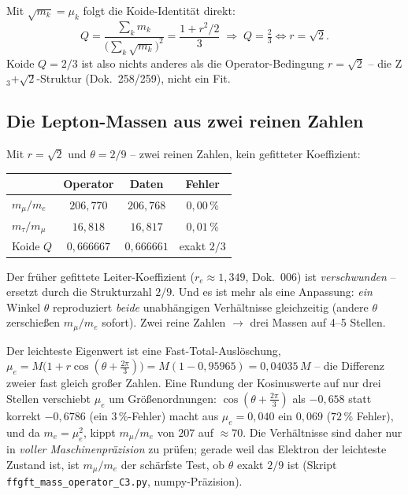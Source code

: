 Mit $\sqrt{m_k}=\mu_k$ folgt die Koide-Identität direkt:
\begin{equation}
  Q=\frac{\sum_k m_k}{\bigl(\sum_k\sqrt{m_k}\bigr)^2}=\frac{1+r^2/2}{3}
  \;\Longrightarrow\; Q=\tfrac23 \iff r=\sqrt2.
\end{equation}
Koide $Q=2/3$ ist also nichts anderes als die Operator-Bedingung $r=\sqrt2$ --
die Z$_3$+$\sqrt2$-Struktur (Dok.~258/259), nicht ein Fit.

\subsection{Die Lepton-Massen aus zwei reinen Zahlen}

Mit $r=\sqrt2$ und $\theta=2/9$ -- zwei reinen Zahlen, kein gefitteter
Koeffizient:

\begin{center}
\begin{tabular}{lccc}
\toprule
 & Operator & Daten & Fehler \\
\midrule
$m_\mu/m_e$    & $206{,}770$ & $206{,}768$ & $0{,}00\,\%$ \\
$m_\tau/m_\mu$ & $16{,}818$  & $16{,}817$  & $0{,}01\,\%$ \\
Koide $Q$      & $0{,}666667$ & $0{,}666661$ & exakt $2/3$ \\
\bottomrule
\end{tabular}
\end{center}

\begin{keyresult}
Der früher gefittete Leiter-Koeffizient ($r_e\approx1{,}349$, Dok.~006) ist
\emph{verschwunden} -- ersetzt durch die Strukturzahl $2/9$. Und es ist mehr
als eine Anpassung: \emph{ein} Winkel $\theta$ reproduziert \emph{beide}
unabhängigen Verhältnisse gleichzeitig (andere $\theta$ zerschießen
$m_\mu/m_e$ sofort). Zwei reine Zahlen $\to$ drei Massen auf 4--5 Stellen.
\end{keyresult}

\begin{warningboxenv}
Der leichteste Eigenwert ist eine Fast-Total-Auslöschung,
$\mu_e = M\bigl(1+r\cos(\theta+\tfrac{2\pi}{3})\bigr)
       = M(1-0{,}95965) = 0{,}04035\,M$ -- die Differenz zweier fast gleich
großer Zahlen. Eine Rundung der Kosinuswerte auf nur drei Stellen verschiebt
$\mu_e$ um Größenordnungen: $\cos(\theta+\tfrac{2\pi}{3})$ als $-0{,}658$ statt
korrekt $-0{,}6786$ (ein $3\,\%$-Fehler) macht aus $\mu_e=0{,}040$ ein
$0{,}069$ ($72\,\%$ Fehler), und da $m_e=\mu_e^2$, kippt $m_\mu/m_e$ von $207$
auf $\approx 70$. Die Verhältnisse sind daher nur in \emph{voller Maschinenpräzision}
zu prüfen; gerade weil das Elektron der leichteste Zustand ist, ist
$m_\mu/m_e$ der schärfste Test, ob $\theta$ exakt $2/9$ ist (Skript
\texttt{ffgft\_mass\_operator\_C3.py}, numpy-Präzision).
\end{warningboxenv}

